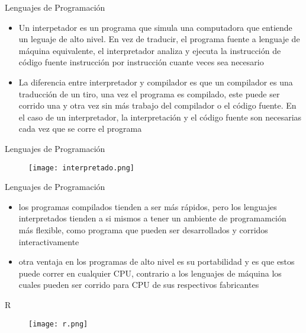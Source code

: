 \documentclass[ignorenonframetext,]{beamer}
\begin{document}
\begin{frame}{Lenguajes de Programación}

\begin{itemize}
\item
  Un interpetador es un programa que simula una computadora que entiende
  un leguaje de alto nivel. En vez de traducir, el programa fuente a
  lenguaje de máquina equivalente, el interpretador analiza y ejecuta la
  instrucción de código fuente instrucción por instrucción cuante veces
  sea necesario
\item
  La diferencia entre interpretador y compilador es que un compilador es
  una traducción de un tiro, una vez el programa es compilado, este
  puede ser corrido una y otra vez sin más trabajo del compilador o el
  código fuente. En el caso de un interpretador, la interpretación y el
  código fuente son necesarias cada vez que se corre el programa
\end{itemize}

\end{frame}

\begin{frame}{Lenguajes de Programación}

\begin{center}
\begin{figure}
\texttt{[image: interpretado.png]}
\end{figure}
\end{center}

\end{frame}

\begin{frame}{Lenguajes de Programación}

\begin{itemize}
\item
  los programas compilados tienden a ser más rápidos, pero los lenguajes
  interpretados tienden a si mismos a tener un ambiente de programamción
  más flexible, como programa que pueden ser desarrollados y corridos
  interactivamente
\item
  otra ventaja en los programas de alto nivel es su portabilidad y es
  que estos puede correr en cualquier CPU, contrario a los lenguajes de
  máquina los cuales pueden ser corrido para CPU de sus respectivos
  fabricantes
\end{itemize}

\end{frame}

\begin{frame}{R}

\begin{center}
\begin{figure}
\texttt{[image: r.png]}
\end{figure}
\end{center}

\end{frame}
\end{document}
